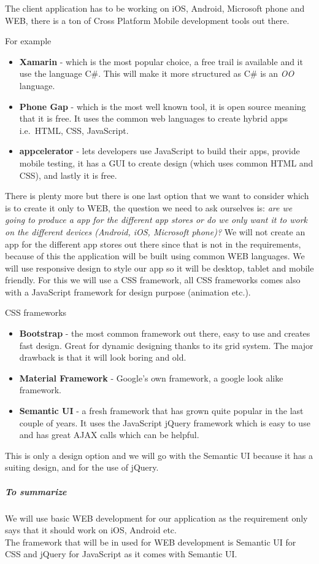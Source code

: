 The client application has to be working on iOS, Android, Microsoft
phone and WEB, there is a ton of Cross Platform Mobile development tools
out there.

For example

\begin{itemize}
\tightlist
\item
  \textbf{Xamarin} - which is the most popular choice, a free trail is
  available and it use the language C\#. This will make it more
  structured as C\# is an \emph{OO} language.
\item
  \textbf{Phone Gap} - which is the most well known tool, it is open
  source meaning that it is free. It uses the common web languages to
  create hybrid apps i.e.~HTML, CSS, JavaScript.
\item
  \textbf{appcelerator} - lets developers use JavaScript to build their
  apps, provide mobile testing, it has a GUI to create design (which
  uses common HTML and CSS), and lastly it is free.
\end{itemize}

There is plenty more but there is one last option that we want to
consider which is to create it only to WEB, the question we need to ask
ourselves is: \emph{are we going to produce a app for the different app
stores or do we only want it to work on the different devices (Android,
iOS, Microsoft phone)?} We will not create an app for the different app
stores out there since that is not in the requirements, because of this
the application will be built using common WEB languages. We will use
responsive design to style our app so it will be desktop, tablet and
mobile friendly. For this we will use a CSS framework, all CSS
frameworks comes also with a JavaScript framework for design purpose
(animation etc.).

CSS frameworks

\begin{itemize}
\tightlist
\item
  \textbf{Bootstrap} - the most common framework out there, easy to use
  and creates fast design. Great for dynamic designing thanks to its
  grid system. The major drawback is that it will look boring and old.
\item
  \textbf{Material Framework} - Google's own framework, a google look
  alike framework.
\item
  \textbf{Semantic UI} - a fresh framework that has grown quite popular
  in the last couple of years. It uses the JavaScript jQuery framework
  which is easy to use and has great AJAX calls which can be helpful.
\end{itemize}

This is only a design option and we will go with the Semantic UI because
it has a suiting design, and for the use of jQuery.

\subparagraph{To summarize}\label{to-summarize}

We will use basic WEB development for our application as the requirement
only says that it should work on iOS, Android etc.\\
The framework that will be in used for WEB development is Semantic UI
for CSS and jQuery for JavaScript as it comes with Semantic UI.
